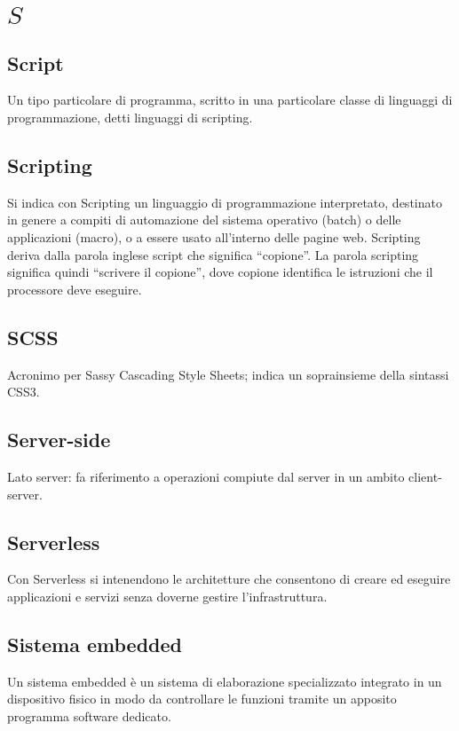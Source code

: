 \section{\quad$S\quad$}

\subsection{Script}
Un tipo particolare di programma, scritto in una particolare classe di linguaggi di programmazione, detti linguaggi di scripting.

\subsection{Scripting}
Si indica con Scripting un linguaggio di programmazione interpretato,  destinato in genere a compiti di automazione del sistema operativo (batch) o delle applicazioni (macro), o a essere usato all’interno delle pagine web.  Scripting deriva dalla  parola  inglese  script  che  significa  “copione”.   La  parola  scripting  significa  quindi  “scrivere  il  copione”, dove copione identifica le istruzioni che il processore deve eseguire.

\subsection{SCSS}
Acronimo per Sassy Cascading Style Sheets; indica un soprainsieme della sintassi CSS3.

\subsection{Server-side}
Lato server: fa riferimento a operazioni compiute dal server in un ambito client-server.

\subsection{Serverless}
Con Serverless si intenendono le architetture che consentono di creare ed eseguire applicazioni e servizi senza doverne gestire l’infrastruttura.

\subsection{Sistema embedded}
Un sistema embedded è un sistema di elaborazione specializzato integrato in un dispositivo fisico in modo da controllare le funzioni tramite un apposito programma software dedicato.


